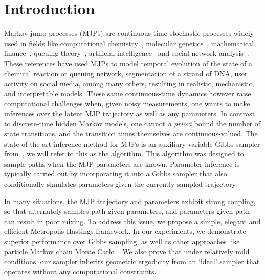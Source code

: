 
\section{Introduction}
\label{sec:intro}
Markov jump processes (MJPs) are continuous-time stochastic processes 
widely used in fields like computational chemistry~\citep{gillespie97}, 
molecular genetics~\citep{FearnSher2006}, mathematical finance~\citep{Elliott06}, 
queuing theory~\citep{Breuer2003}, artificial intelligence~\citep{XuShe10} and
social-network analysis~\citep{pan2016markov}. %
These references have used MJPs to model temporal evolution of the state 
of a chemical reaction or queuing network, segmentation of a strand of 
DNA, user activity on social media, among many others, resulting in 
realistic, mechanistic, and interpretable models. %
These same continuous-time dynamics however raise computational
challenges when, given noisy measurements, one wants to make inferences 
over the latent MJP trajectory as well as any parameters. 
In contrast to {discrete-time} hidden Markov models, one cannot 
{\em a priori} bound the number of state transitions, and the transition 
times themselves are continuous-valued. 
The state-of-the-art inference method for MJPs is an auxiliary variable 
Gibbs sampler from~\cite{RaoTeh13}, we will refer to this as the {\algname} 
algorithm. This  algorithm was designed to sample paths when the MJP parameters
are known. Parameter inference is typically carried out by 
incorporating it into a Gibbs sampler that also conditionally simulates
parameters given the currently sampled trajectory. 

In many situations, the MJP trajectory and parameters exhibit 
strong coupling, so that alternately samples path given
parameters, and parameters given path can result in poor mixing.  
To address this issue, we propose a simple, elegant and efficient 
Metropolis-Hastings framework. 
In our experiments, we demonstrate superior 
performance over Gibbs sampling, as well as other approaches like 
particle Markov chain Monte Carlo~\citep{Andrieu10}. We also prove 
that under relatively mild conditions, our sampler inherits geometric 
ergodicity from an `ideal' sampler that operates without any computational 
constraints.

